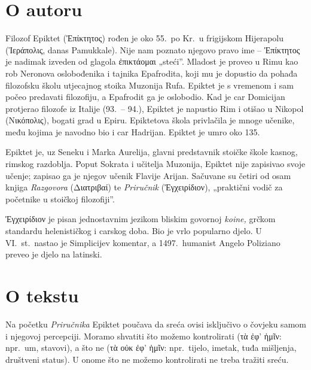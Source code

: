 \section*{O autoru}

Filozof Epiktet \textgreek[variant=ancient]{(Ἐπίκτητος)} rođen je oko 55.\ po Kr.\ u frigijskom Hijerapolu \textgreek[variant=ancient]{(Ἱεράπολις,} danas Pamukkale). Nije nam poznato njegovo pravo ime – \textgreek[variant=ancient]{Ἐπίκτητος} je nadimak izveden od glagola \textgreek[variant=ancient]{ἐπικτάομαι} „steći''. Mladost je proveo u Rimu kao rob Neronova oslobođenika i tajnika Epafrodita, koji mu je dopustio da pohađa filozofsku školu utjecajnog stoika Muzonija Rufa. Epiktet je s vremenom i sam počeo predavati filozofiju, a Epafrodit ga je oslobodio. Kad je car Domicijan protjerao filozofe iz Italije (93.\ – 94.), Epiktet je napustio Rim i otišao u Nikopol \textgreek[variant=ancient]{(Νικόπολις),} bogati grad u Epiru. Epiktetova škola privlačila je mnoge učenike, među kojima je navodno bio i car Hadrijan. Epiktet je umro oko 135. 

Epiktet je, uz Seneku i Marka Aurelija, glavni predstavnik stoičke škole kasnog, rimskog razdoblja. Poput Sokrata i učitelja Muzonija, Epiktet nije zapisivao svoje učenje; zapisao ga je njegov učenik Flavije Arijan. Sačuvane su četiri od osam knjiga \textit{Razgovora} \textgreek[variant=ancient]{(Διατριβαί)} te \textit{Priručnik} \textgreek[variant=ancient]{(Ἐγχειρίδιον),} „praktični vodič za početnike u stoičkoj filozofiji''. 

\textgreek[variant=ancient]{Ἐγχειρίδιον} je pisan jednostavnim jezikom bliskim govornoj \textit{koine,} grčkom standardu helenističkog i carskog doba. Bio je vrlo popularno djelo. U VI.~st.\ nastao je Simplicijev komentar, a 1497.\ humanist Angelo Poliziano preveo je djelo na latinski.

\section*{O tekstu}

Na početku \textit{Priručnika} Epiktet poučava da sreća ovisi isključivo o čovjeku samom i njegovoj percepciji. Moramo shvatiti što možemo kontrolirati \textgreek[variant=ancient]{(τὰ ἐφ' ἡμῖν:} npr.\ um, stavovi), a što ne \textgreek[variant=ancient]{(τὰ οὐκ ἐφ' ἡμῖν:} npr.\ tijelo, imetak, tuđa mišljenja, društveni status). U onome što ne možemo kontrolirati ne treba tražiti sreću.


